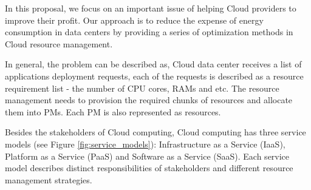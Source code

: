 In this proposal, we focus on an important issue of helping Cloud providers to improve their profit. Our approach is to reduce the expense of energy consumption in data centers by providing a series of optimization methods in Cloud resource management.

In general, the problem can be described as, Cloud data center receives a list of applications deployment requests, each of the requests is described as a resource requirement list - the number of CPU cores, RAMs and etc. The resource management needs to provision the required chunks of resources and allocate them into PMs. Each PM is also represented as resources.


Besides the stakeholders of Cloud computing, Cloud computing has three service models \cite{Mell:2011jj} (see Figure \ref{fig:service_models}): Infrastructure as a Service (IaaS), Platform as a Service (PaaS) and Software as a Service (SaaS). 
Each service model describes distinct responsibilities of stakeholders and different resource management strategies.

